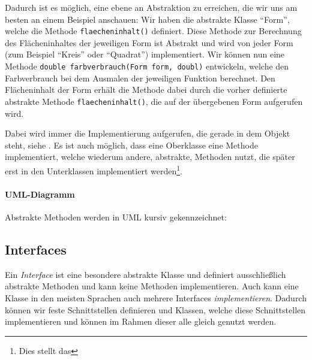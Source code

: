 	Dadurch ist es möglich, eine ebene an Abstraktion zu erreichen, die wir uns am besten an einem Beispiel anschauen: Wir haben die abstrakte Klasse \enquote{Form}, welche die Methode \texttt{flaecheninhalt()} definiert. Diese Methode zur Berechnung des Flächeninhaltes der jeweiligen Form ist Abstrakt und wird von jeder Form (zum Beispiel \enquote{Kreis} oder \enquote{Quadrat}) implementiert. Wir können nun eine Methode \lstinline|double farbverbrauch(Form form, doubl)| entwickeln, welche den Farbverbrauch bei dem Ausmalen der jeweiligen Funktion berechnet. Den Flächeninhalt der Form erhält die Methode dabei durch die vorher definierte abstrakte Methode \texttt{flaecheninhalt()}, die auf der übergebenen Form aufgerufen wird.
	
	Dabei wird immer die Implementierung aufgerufen, die gerade in dem Objekt steht, siehe . Es ist auch möglich, dass eine Oberklasse eine Methode implementiert, welche wiederum andere, abstrakte, Methoden nutzt, die später erst in den Unterklassen implementiert werden\footnote{Dies stellt das }.
	
	\paragraph{UML-Diagramm}
		Abstrakte Methoden werden in UML kursiv gekennzeichnet:
		\begin{figure}[H]
			\centering
		\end{figure}

\subsection{Interfaces} \imperativeMark \oopMark

	Ein \textit{Interface} ist eine besondere abstrakte Klasse und definiert ausschließlich abstrakte Methoden und kann keine Methoden implementieren. Auch kann eine Klasse in den meisten Sprachen auch mehrere Interfaces \textit{implementieren}. Dadurch können wir feste Schnittstellen definieren und Klassen, welche diese Schnittstellen implementieren und können im Rahmen dieser alle gleich genutzt werden.
	
